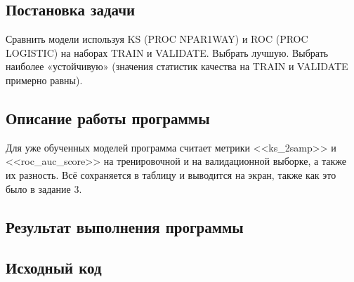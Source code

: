 \documentclass[12pt,a4paper]{article}
\begin{document}
  \subsection{Постановка задачи}
  Сравнить модели используя KS (PROC NPAR1WAY) и ROC (PROC LOGISTIC) на
  наборах TRAIN и VALIDATE. Выбрать лучшую. Выбрать наиболее «устойчивую»
  (значения статистик качества на TRAIN и VALIDATE примерно равны).

  \subsection{Описание работы программы}
  Для уже обученных моделей программа считает метрики <<ks\_2samp>> и <<roc\_auc\_score>>
  на тренировочной и на валидационной выборке, а также их разность.
  Всё сохраняется в таблицу и выводится на экран, также как это было в задание 3.

  \subsection{Результат выполнения программы}

  \subsection{Исходный код}
\begin{Shaded}
\begin{Highlighting}[]

\OperatorTok{=}\NormalTok{: [], }\NormalTok{: [], }\NormalTok{: [], }\NormalTok{: [], }\NormalTok{: [],\})}
\OperatorTok{=}
\OperatorTok{=}
\OperatorTok{=}
    \NormalTok{ : ks\_2samp(y\_train, y\_pred\_train)[}\NormalTok{],}
    \NormalTok{ : ks\_2samp(y\_test, y\_pred\_test)[}\NormalTok{],}
\OperatorTok{=}\NormalTok{)}
\end{Highlighting}
\end{Shaded}
\end{document}
